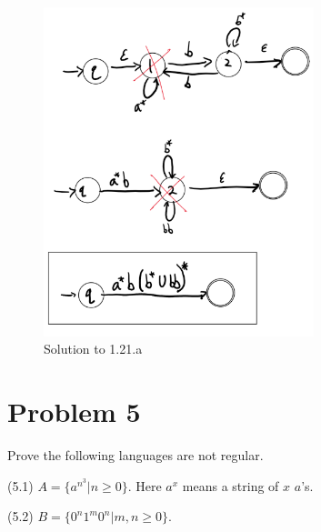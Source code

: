 \documentclass[11pt]{article}
\begin{document}
\begin{figure}[H]
     \centering
     \includegraphics[width = 0.7\textwidth]{1_21a_CSCI338.PNG}
     \caption{Solution to 1.21.a}
     \label{fig:1.21.a}
 \end{figure}

\newpage
\section*{Problem 5}

Prove the following languages are not regular.

(5.1) $A=\{a^{n^3}|n\geq 0\}$. Here $a^x$ means a string of $x$ $a$'s.
\newline

(5.2) $B=\{0^n1^m0^n|m,n\geq 0\}$.
\newline
\end{document}
